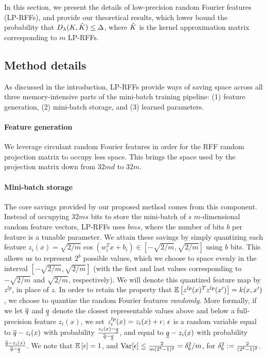In this section, we present the details of low-precision random Fourier features (LP-RFFs), and provide our theoretical results, which lower bound the probability that $D_{\lambda}(K,\tilde{K}) \leq \Delta$, where $\tilde{K}$ is the kernel approximation matrix corresponding to $m$ LP-RFFs.

\subsection{Method details}
As discussed in the introduction, LP-RFFs provide ways of saving space across all three memory-intensive parts of the mini-batch training pipeline: (1) feature generation, (2) mini-batch storage, and (3) learned parameters.

\paragraph{Feature generation} We leverage circulant random Fourier features \citep{yu15} in order for the RFF random projection matrix to occupy less space. This brings the space used by the projection matrix down from $32md$ to $32m$.

\paragraph{Mini-batch storage} The core savings provided by our proposed method comes from this component.  Instead of occupying $32ms$ bits to store the mini-batch of $s$ $m$-dimensional random feature vectors, LP-RFFs uses $bms$, where the number of bits $b$ per feature is a tunable parameter.  We attain these savings by simply quantizing each feature $z_i(x) = \sqrt{2/m}\cos(w_i^T x + b_i) \in [-\sqrt{2/m},\sqrt{2/m}]$ using $b$ bits.  This allows us to represent $2^b$ possible values, which we choose to space evenly in the interval $[-\sqrt{2/m},\sqrt{2/m}]$ (with the first and last values corresponding to $-\sqrt{2/m}$ and $\sqrt{2/m}$, respectively). We will denote this quantized feature map by $z^{lp}$, in place of $z$. In order to retain the property that $\expect{}{z^{lp}(x)^T z^{lp}(x')} = k(x,x')$, we choose to quantize the random Fourier features \textit{randomly}.  More formally, if we let $\overline{q}$ and $\underline{q}$ denote the closest representable values above and below a full-precision feature $z_i(x)$, we set $z^{lp}_i(x) = z_i(x) + \epsilon$; $\epsilon$ is a random variable equal to $\overline{q} - z_i(x)$ with probability $\frac{z_i(x)-\underline{q}}{\overline{q}-\underline{q}}$, and equal to $\underline{q} - z_i(x)$ with probability $\frac{\overline{q}-z_i(x)}{\overline{q}-\underline{q}}$.  We note that $\expect{}{\eps} = 1$, and ${\rm Var}[\epsilon] \leq \frac{2}{m(2^b-1)^2} = \delta_b^2/m$, for $\delta_b^2 := \frac{2}{(2^b-1)^2}$.

